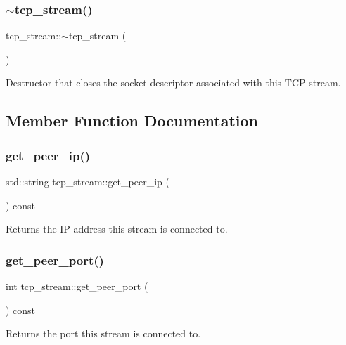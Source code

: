 \subsubsection{\texorpdfstring{$\sim$tcp\+\_\+stream()}{~tcp\_stream()}}
{\footnotesize\ttfamily tcp\+\_\+stream\+::$\sim$tcp\+\_\+stream (\begin{DoxyParamCaption}{ }\end{DoxyParamCaption})}

Destructor that closes the socket descriptor associated with this T\+CP stream. 

\subsection{Member Function Documentation}
\mbox{\label{classtcp__stream_ac9afe2de961bc45ffb1b614e5718b353}} 
\subsubsection{\texorpdfstring{get\+\_\+peer\+\_\+ip()}{get\_peer\_ip()}}
{\footnotesize\ttfamily std\+::string tcp\+\_\+stream\+::get\+\_\+peer\+\_\+ip (\begin{DoxyParamCaption}{ }\end{DoxyParamCaption}) const}

\begin{DoxyReturn}{Returns}
the IP address this stream is connected to. 
\end{DoxyReturn}
\mbox{\label{classtcp__stream_a5562bfad5ec43e358b6bc63386166a50}} 
\subsubsection{\texorpdfstring{get\+\_\+peer\+\_\+port()}{get\_peer\_port()}}
{\footnotesize\ttfamily int tcp\+\_\+stream\+::get\+\_\+peer\+\_\+port (\begin{DoxyParamCaption}{ }\end{DoxyParamCaption}) const}

\begin{DoxyReturn}{Returns}
the port this stream is connected to. 
\end{DoxyReturn}
\mbox{\label{classtcp__stream_a061ef2188c1cf0eebc7290dbc908f06e}} 
